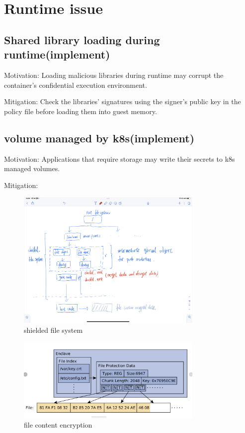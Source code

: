 \section{Runtime issue}
\subsection{Shared library loading during runtime(implement)}
Motivation: Loading malicious libraries during runtime may corrupt the container's confidential execution environment.

Mitigation: Check the libraries' signatures using the signer's public key in the policy file before loading them into guest memory.


\subsection{volume managed by k8s(implement)}
Motivation: Applications that require storage may write their secrets to k8s managed volumes.

Mitigation: 
\begin{figure}[H]
    \centering
    \includegraphics[width=0.8\textwidth]{images/IMG_4413.PNG}
    \caption[shielded file system]{shielded file system}
    \label{fig:shielded_filesystem}
\end{figure}

\begin{figure}[H]
    \centering
    \includegraphics[width=0.8\textwidth]{images/fileencption.png}
    \caption[file content encryption]{file content encryption}
    \label{fig:file_content_encryption}
\end{figure}




